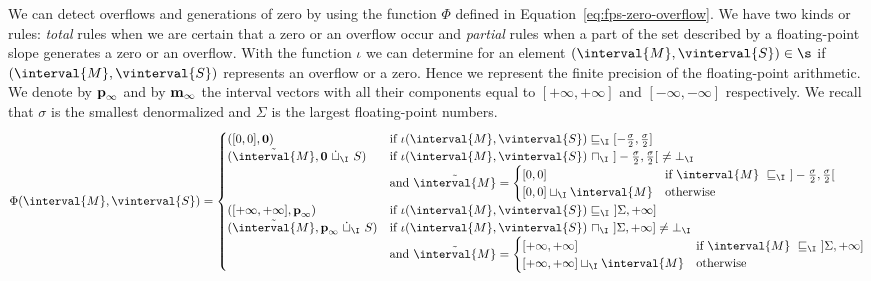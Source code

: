 We can detect overflows and generations of zero by using the function
$\Phi$ defined in Equation~\eqref{eq:fps-zero-overflow}. We have two
kinds or rules: \textit{total} rules when we are certain that a zero
or an overflow occur and \textit{partial} rules when a part of the set
described by a floating-point slope generates a zero or an
overflow. With the function $\iota$ we can determine for an element
$(\interval{M},\vinterval{S}) \in \s$ if $(\interval{M},
\vinterval{S})$ represents an overflow or a zero. Hence we represent
the finite precision of the floating-point arithmetic. We denote by
$\text{\textbf{p}}_\infty$ and by $\text{\textbf{m}}_\infty$ the
interval vectors with all their components equal to
$[+\infty,+\infty]$ and $[-\infty,-\infty]$ respectively. We recall
that $\sigma$ is the smallest denormalized and $\Sigma$ is the largest
floating-point numbers. {\small
  \begin{equation}
    \label{eq:fps-zero-overflow}
    \Phi(\interval{M}, \vinterval{S}) = 
    \begin{cases}
      ([0,0], \mathbf{0}) 
      & \text{if } \iota(\interval{M}, \vinterval{S}) \sqsubseteq_\I
      [-\frac{\sigma}{2},\frac{\sigma}{2}]
      \\
      (\tilde{\interval{M}},
      \mathbf{0}\ \dot{\sqcup}_\I\ S) 
      & \text{if } \iota(\interval{M}, \vinterval{S})
      \ \sqcap_\I\ ]-\frac{\sigma}{2},\frac{\sigma}{2}[\ \neq \bot_\I
      \\
      & \text{and }\tilde{\interval{M}} =
      \begin{cases}
        [0,0] & \text{if } \interval{M}\ 
        \sqsubseteq_\I\ ]-\frac{\sigma}{2},\frac{\sigma}{2}[
        \\
[0,0] \sqcup_\I \interval{M} & \text{otherwise}
      \end{cases}
      \\
      ([+\infty, +\infty], \text{\textbf{p}}_\infty) 
      & \text{if } \iota(\interval{M}, \vinterval{S}) \sqsubseteq_\I\ 
      ]\Sigma,+\infty]
      \\
      (\tilde{\interval{M}}, \text{\textbf{p}}_\infty\ \dot{\sqcup}_\I\ S) & 
      \text{if }
      \iota(\interval{M}, \vinterval{S})\ 
      \sqcap_\I\ ]\Sigma,+\infty] \neq \bot_\I
      \\
      & \text{and }\tilde{\interval{M}} =
      \begin{cases}
        [+\infty, +\infty] & \text{if } 
        \interval{M}\ \sqsubseteq_\I\ ]\Sigma,+\infty]
        \\
[+\infty,+\infty] \sqcup_\I \interval{M} & \text{otherwise}

\end{cases}
\end{cases}
\end{equation}}
